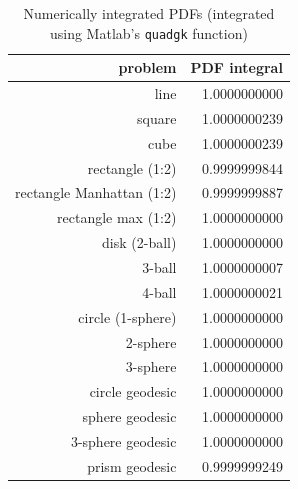 \begin{table}[ht]
  \centering
  \begin{tabular}{r|r}
                  problem & PDF integral \\
     \hline 
                     line & 1.0000000000 \\
                   square & 1.0000000239 \\
                     cube & 1.0000000239 \\
          rectangle (1:2) & 0.9999999844 \\
rectangle Manhattan (1:2) & 0.9999999887 \\
      rectangle max (1:2) & 1.0000000000 \\
            disk (2-ball) & 1.0000000000 \\
                   3-ball & 1.0000000007 \\
                   4-ball & 1.0000000021 \\
        circle (1-sphere) & 1.0000000000 \\
                 2-sphere & 1.0000000000 \\
                 3-sphere & 1.0000000000 \\
          circle geodesic & 1.0000000000 \\
          sphere geodesic & 1.0000000000 \\
        3-sphere geodesic & 1.0000000000 \\
           prism geodesic & 0.9999999249 \\
  \end{tabular}
  \caption{Numerically integrated PDFs (integrated using Matlab's {\tt quadgk} function)}
  \label{tab:numerical_pdf_sum}
\end{table}
